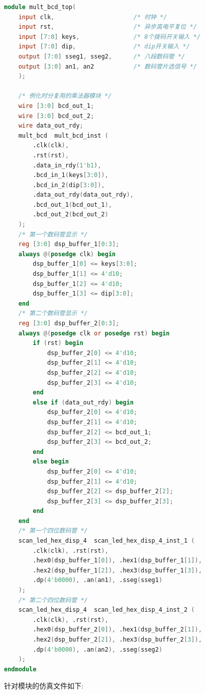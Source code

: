 \documentclass{article}
\begin{document}
\begin{lstlisting}[language=Verilog, caption={top}]
module mult_bcd_top(
    input clk,                      /* 时钟 */
    input rst,                      /* 异步高电平复位 */
    input [7:0] keys,               /* 8个拨码开关输入 */
    input [7:0] dip,                /* dip开关输入 */
    output [7:0] sseg1, sseg2,      /* 八段数码管 */
    output [3:0] an1, an2           /* 数码管片选信号 */
    );

    /* 例化时分复用的乘法器模块 */
    wire [3:0] bcd_out_1;
    wire [3:0] bcd_out_2;
    wire data_out_rdy;
    mult_bcd  mult_bcd_inst (
        .clk(clk),
        .rst(rst),
        .data_in_rdy(1'b1),
        .bcd_in_1(keys[3:0]),
        .bcd_in_2(dip[3:0]),
        .data_out_rdy(data_out_rdy),
        .bcd_out_1(bcd_out_1),
        .bcd_out_2(bcd_out_2)
    );
    /* 第一个数码管显示 */
    reg [3:0] dsp_buffer_1[0:3];
    always @(posedge clk) begin
        dsp_buffer_1[0] <= keys[3:0];
        dsp_buffer_1[1] <= 4'd10;
        dsp_buffer_1[2] <= 4'd10;
        dsp_buffer_1[3] <= dip[3:0];
    end
    /* 第二个数码管显示 */
    reg [3:0] dsp_buffer_2[0:3];
    always @(posedge clk or posedge rst) begin
        if (rst) begin
            dsp_buffer_2[0] <= 4'd10;
            dsp_buffer_2[1] <= 4'd10;
            dsp_buffer_2[2] <= 4'd10;
            dsp_buffer_2[3] <= 4'd10;
        end
        else if (data_out_rdy) begin
            dsp_buffer_2[0] <= 4'd10;
            dsp_buffer_2[1] <= 4'd10;
            dsp_buffer_2[2] <= bcd_out_1;
            dsp_buffer_2[3] <= bcd_out_2;
        end
        else begin
            dsp_buffer_2[0] <= 4'd10;
            dsp_buffer_2[1] <= 4'd10;
            dsp_buffer_2[2] <= dsp_buffer_2[2];
            dsp_buffer_2[3] <= dsp_buffer_2[3];
        end
    end
    /* 第一个四位数码管 */
    scan_led_hex_disp_4  scan_led_hex_disp_4_inst_1 (
        .clk(clk), .rst(rst),
        .hex0(dsp_buffer_1[0]), .hex1(dsp_buffer_1[1]),
        .hex2(dsp_buffer_1[2]), .hex3(dsp_buffer_1[3]),
        .dp(4'b0000), .an(an1), .sseg(sseg1)
    );
    /* 第二个四位数码管 */
    scan_led_hex_disp_4  scan_led_hex_disp_4_inst_2 (
        .clk(clk), .rst(rst),
        .hex0(dsp_buffer_2[0]), .hex1(dsp_buffer_2[1]),
        .hex2(dsp_buffer_2[2]), .hex3(dsp_buffer_2[3]),
        .dp(4'b0000), .an(an2), .sseg(sseg2)
    );
endmodule    
\end{lstlisting}
针对模块的仿真文件如下:
\end{document}
